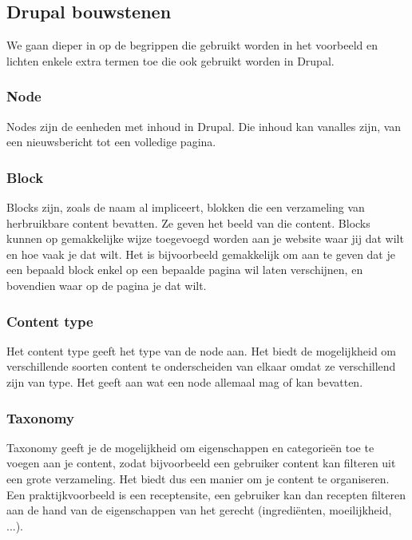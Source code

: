 \subsection{Drupal bouwstenen}

We gaan dieper in op de begrippen die gebruikt worden in het voorbeeld en lichten enkele extra termen toe die ook gebruikt worden in Drupal.

\subsubsection{Node}
Nodes zijn de eenheden met inhoud in Drupal. Die inhoud kan vanalles zijn, van een nieuwsbericht tot een volledige pagina. %


\subsubsection{Block}
Blocks zijn, zoals de naam al impliceert, blokken die een verzameling van herbruikbare content bevatten. Ze geven het beeld van die content. Blocks kunnen op gemakkelijke wijze toegevoegd worden aan je website waar jij dat wilt en hoe vaak je dat wilt. Het is bijvoorbeeld gemakkelijk om aan te geven dat je een bepaald block enkel op een bepaalde pagina wil laten verschijnen, en bovendien waar op de pagina je dat wilt.

\subsubsection{Content type}
Het content type geeft het type van de node aan. Het biedt de mogelijkheid om verschillende soorten content te onderscheiden van elkaar omdat ze verschillend zijn van type. Het geeft aan wat een node allemaal mag of kan bevatten.

\subsubsection{Taxonomy}
Taxonomy geeft je de mogelijkheid om eigenschappen en categorie\"{e}n toe te voegen aan je content, zodat bijvoorbeeld een gebruiker content kan filteren uit een grote verzameling. Het biedt dus een manier om je content te organiseren. Een praktijkvoorbeeld is een receptensite, een gebruiker kan dan recepten filteren aan de hand van de eigenschappen van het gerecht (ingredi\"{e}nten, moeilijkheid, ...).

